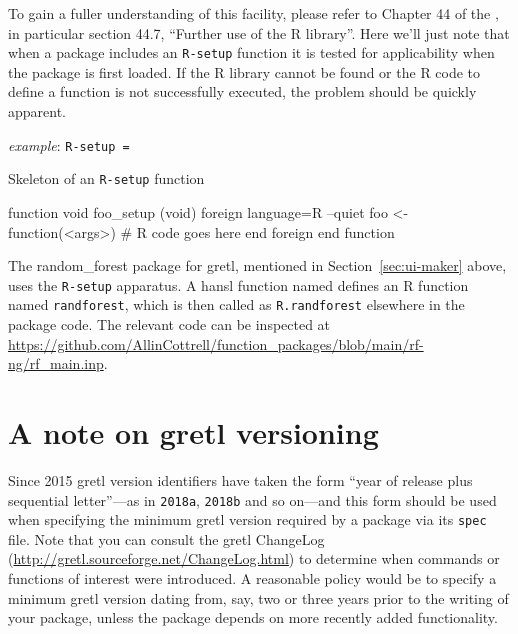 \documentclass[oneside]{book}
\newcommand{\ttusage}[1]{\textit{example}: \quad \texttt{#1}}
\begin{document}
\begin{description}
  To gain a fuller understanding of this facility, please refer to
  Chapter 44 of the \GUG, in particular section 44.7, ``Further use of
  the R library''. Here we'll just note that when a package includes
  an \texttt{R-setup} function it is tested for applicability when the
  package is first loaded. If the \textsf{R} library cannot be found
  or the \textsf{R} code to define a function is not successfully
  executed, the problem should be quickly apparent.

  \ttusage{R-setup = }

\begin{script}[htbp]
  \caption{Skeleton of an \texttt{R-setup} function}
  \label{ex:rsetup}
\begin{code}
   function void foo_setup (void)
      foreign language=R --quiet
      foo <- function(<args>) {
         # R code goes here
      }
      end foreign
   end function
\end{code}
\end{script}

The \textsf{random\_forest} package for gretl, mentioned in
Section~\ref{sec:ui-maker} above, uses the \texttt{R-setup} apparatus.
A hansl function named  defines an \textsf{R}
function named \texttt{randforest}, which is then called as
\texttt{R.randforest} elsewhere in the package code. The relevant code
can be inspected at
\url{https://github.com/AllinCottrell/function_packages/blob/main/rf-ng/rf_main.inp}.

\end{description}

\section{A note on gretl versioning}
\label{sec:versioning}

Since 2015 gretl version identifiers have taken the form ``year of
release plus sequential letter''---as in \texttt{2018a},
\texttt{2018b} and so on---and this form should be used when
specifying the minimum gretl version required by a package via its
\texttt{spec} file. Note that you can consult the gretl ChangeLog
(\url{http://gretl.sourceforge.net/ChangeLog.html}) to determine when
commands or functions of interest were introduced. A reasonable policy
would be to specify a minimum gretl version dating from, say, two or
three years prior to the writing of your package, unless the package
depends on more recently added functionality.
\end{document}
